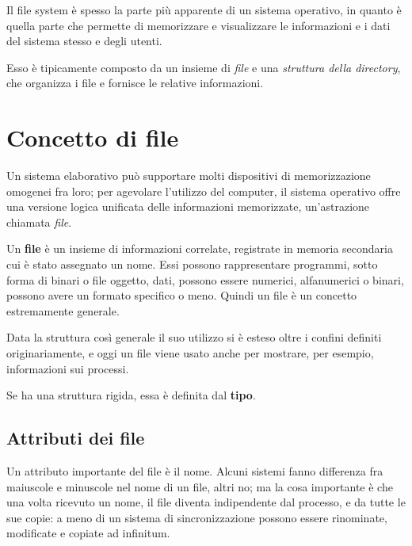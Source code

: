 Il file system è spesso la parte più apparente di un sistema operativo, in quanto è quella parte che permette di memorizzare e visualizzare le informazioni e i dati del sistema stesso e degli utenti.

Esso è tipicamente composto da un insieme di \textit{file} e una \textit{struttura della directory}, che organizza i file e fornisce le relative informazioni.

\section{Concetto di file}
    Un sistema elaborativo può supportare molti dispositivi di memorizzazione omogenei fra loro; per agevolare l'utilizzo del computer, il sistema operativo offre una versione logica unificata delle informazioni memorizzate, un'astrazione chiamata \textit{file}.
    
    Un \textbf{file} è un insieme di informazioni correlate, registrate in memoria secondaria cui è stato assegnato un nome. Essi possono rappresentare programmi, sotto forma di binari o file oggetto, dati, possono essere numerici, alfanumerici o binari, possono avere un formato specifico o meno. Quindi un file è un concetto estremamente generale.
    
    Data la struttura così generale il suo utilizzo si è esteso oltre i confini definiti originariamente, e oggi un file viene usato anche per mostrare, per esempio, informazioni sui processi.
    
    Se ha una struttura rigida, essa è definita dal \textbf{tipo}.
    
    \subsection{Attributi dei file}
        Un attributo importante del file è il nome. Alcuni sistemi fanno differenza fra maiuscole e minuscole nel nome di un file, altri no; ma la cosa importante è che una volta ricevuto un nome, il file diventa indipendente dal processo, e da tutte le sue copie: a meno di un sistema di sincronizzazione possono essere rinominate, modificate e copiate ad infinitum.
        
